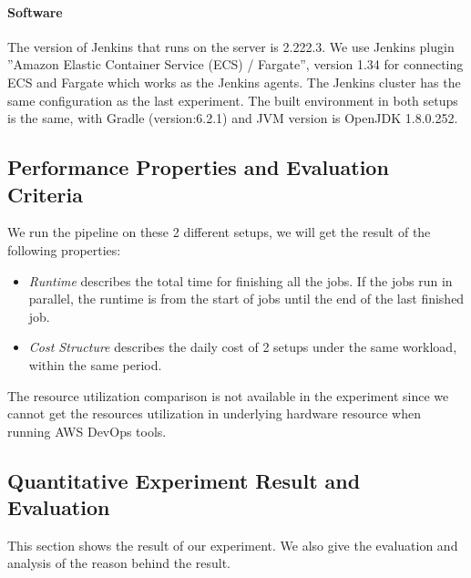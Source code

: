 \paragraph{Software}
The version of Jenkins that runs on the server is 2.222.3. We use Jenkins plugin ”Amazon Elastic Container Service (ECS) / Fargate”, version 1.34 for connecting ECS and Fargate which works as the Jenkins agents. The Jenkins cluster has the same configuration as the last experiment. The built environment in both setups is the same, with Gradle (version:6.2.1) and JVM version is OpenJDK 1.8.0.252.
\subsection{Performance Properties and Evaluation Criteria}
We run the pipeline on these 2 different setups, we will get the result of the following properties:
\begin{itemize}
\item \textit{Runtime} describes the total time for finishing all the jobs. If the jobs run in parallel, the runtime is from the start of jobs until the end of the last finished job.
\item \textit{Cost Structure} describes the daily cost of 2 setups under the same workload, within the same period.
\end{itemize}
The resource utilization comparison is not available in the experiment since we cannot get the resources utilization in underlying hardware resource when running AWS DevOps tools.
\subsection{Quantitative Experiment Result and Evaluation}
This section shows the result of our experiment. We also give the evaluation and analysis of the reason behind the result.
